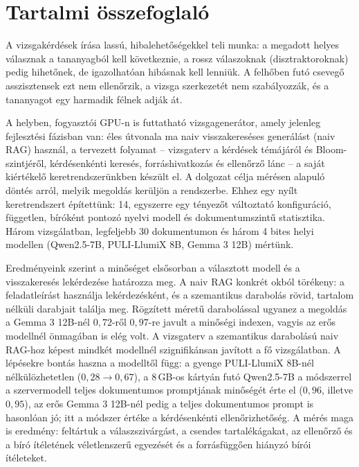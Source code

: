 \chapter*{Tartalmi összefoglaló}
\thispagestyle{plain}

A vizsgakérdések írása lassú, hibalehetőségekkel teli munka: a megadott helyes válasznak a tananyagból kell
következnie, a rossz válaszoknak (disztraktoroknak) pedig hihetőnek, de igazolhatóan hibásnak kell lenniük.
A felhőben futó csevegő asszisztensek ezt nem ellenőrzik, a vizsga szerkezetét nem szabályozzák, és a
tananyagot egy harmadik félnek adják át.

A \Mimir{} helyben, fogyasztói GPU-n is futtatható vizsgagenerátor, amely jelenleg fejlesztési fázisban van: éles
útvonala ma naiv visszakereséses generálást (naiv RAG) használ, a tervezett folyamat -- vizsgaterv a kérdések
témájáról és Bloom-szintjéről, kérdésenkénti keresés, forráshivatkozás és ellenőrző lánc -- a saját
kiértékelő keretrendszerünkben készült el. A dolgozat célja mérésen alapuló döntés arról, melyik megoldás
kerüljön a rendszerbe. Ehhez egy nyílt keretrendszert építettünk: 14, egyszerre egy tényezőt változtató
konfiguráció, független, bíróként pontozó nyelvi modell és dokumentumszintű statisztika. Három vizsgálatban,
legfeljebb 30 dokumentumon és három 4 bites helyi modellen (Qwen2.5-7B, PULI-LlumiX 8B, Gemma 3 12B) mértünk.

Eredményeink szerint a minőséget elsősorban a választott modell és a visszakeresés lekérdezése határozza meg.
A naiv RAG konkrét okból törékeny: a feladatleírást használja lekérdezésként, és a szemantikus darabolás
rövid, tartalom nélküli darabjait találja meg. Rögzített méretű darabolással ugyanez a megoldás a Gemma 3
12B-nél $0{,}72$-ről $0{,}97$-re javult a minőségi indexen, vagyis az erős modellnél önmagában is elég volt. A
vizsgaterv a szemantikus darabolású naiv RAG-hoz képest mindkét modellnél szignifikánsan javított a fő
vizsgálatban. A lépésekre bontás haszna a modelltől függ: a gyenge PULI-LlumiX 8B-nél nélkülözhetetlen
($0{,}28\to0{,}67$), a 8\,GB-os kártyán futó Qwen2.5-7B a módszerrel a szervermodell teljes dokumentumos
promptjának minőségét érte el ($0{,}96$, illetve $0{,}95$), az erős Gemma 3 12B-nél pedig a teljes
dokumentumos prompt is hasonlóan jó; itt a módszer értéke a kérdésenkénti ellenőrizhetőség. A mérés maga is
eredmény: feltártuk a válaszszivárgást, a csendes tartalékágakat, az ellenőrző és a bíró ítéletének
véletlenszerű egyezését és a forrásfüggően hiányzó bírói ítéleteket.

